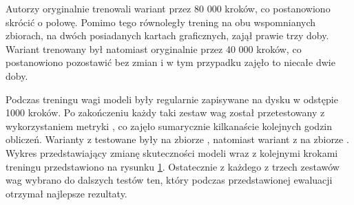 Autorzy  oryginalnie trenowali wariant  przez 80 000 kroków, co postanowiono skrócić o połowę. Pomimo tego równoległy trening na obu wspomnianych zbiorach, na dwóch posiadanych kartach graficznych, zajął prawie trzy doby. Wariant  trenowany był natomiast oryginalnie przez 40 000 kroków, co postanowiono pozostawić bez zmian i w tym przypadku zajęło to niecałe dwie doby. 

\begin{figure}[ht]
  \begin{center}
    \label{plot:ratsql-accuracy}
  \end{center}
\end{figure}

Podczas treningu wagi modeli były regularnie zapisywane na dysku w odstępie 1000 kroków. Po zakończeniu każdy taki zestaw wag został przetestowany z wykorzystaniem metryki , co zajęło sumarycznie kilkanaście kolejnych godzin obliczeń. Warianty z  testowane były na zbiorze , natomiast wariant z  na zbiorze . Wykres przedstawiający zmianę skuteczności modeli wraz z kolejnymi krokami treningu przedstawiono na rysunku \ref{plot:ratsql-accuracy}. Ostatecznie z każdego z trzech zestawów wag wybrano do dalszych testów ten, który podczas przedstawionej ewaluacji otrzymał najlepsze rezultaty. 

